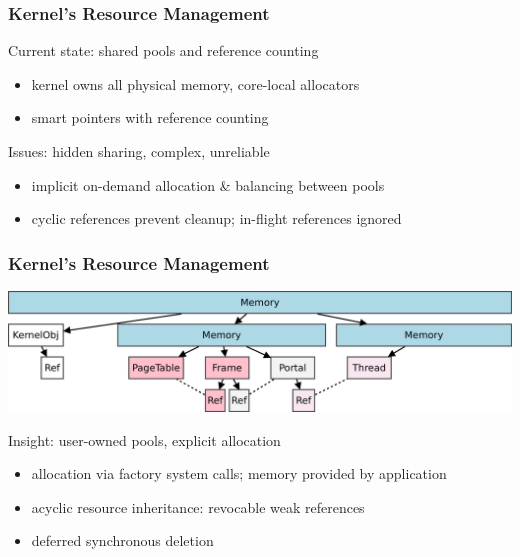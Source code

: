 \documentclass[9pt]{beamer}
\begin{document}
\begin{frame}
  \frametitle{Kernel's Resource Management}

  \begin{block}{Current state: shared pools and reference counting}
    \begin{itemize}
    \item kernel owns all physical memory, core-local allocators
    \item smart pointers with reference counting
    \end{itemize}
  \end{block}

  \vfill
  \vfill
  
  \begin{block}{Issues: hidden sharing, complex, unreliable}
    \begin{itemize}
    \item implicit on-demand allocation \& balancing between pools
    \item cyclic references prevent cleanup; in-flight references ignored
    \end{itemize}
  \end{block}
\end{frame}

\begin{frame}
  \frametitle{Kernel's Resource Management}

  \vfill
  \begin{center}
  \includegraphics[width=\textwidth]{figures/cap-tree.pdf}
  \end{center}
  \vfill

  \begin{block}{Insight: user-owned pools, explicit allocation}
    \begin{itemize}
    \item allocation via factory system calls; memory provided by application
    \item acyclic resource inheritance: revocable weak references
    \item deferred synchronous deletion
    \end{itemize}
  \end{block}
\end{frame}
\end{document}
